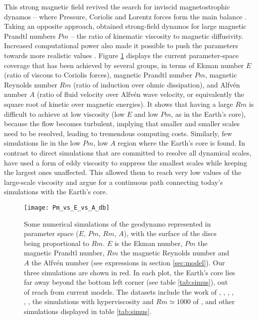 \documentclass[12pt, a4paper]{article}
\begin{document}
This strong magnetic field revived the search for inviscid magnetostrophic dynamos -- where Pressure, Coriolis and Lorentz forces form the main balance \citep{livermore2013, wu2015}.
Taking an opposite approach, \citet{dormy2016} obtained strong-field dynamos for large magnetic Prandtl numbers $Pm$ -- the ratio of kinematic viscosity to magnetic diffusivity.
Increased computational power also made it possible to push the parameters towards more realistic values \citep{kageyama2008,sakuraba2009, sheyko2014phd, yadav2016b}.
Figure \ref{fig:Pm_vs_E} displays the current parameter-space coverage that has been achieved by several groups, in terms of Ekman number $E$ (ratio of viscous to Coriolis forces), magnetic Prandtl number $Pm$, magnetic Reynolds number $Rm$ (ratio of induction over ohmic dissipation), and Alfvén number $A$ (ratio of fluid velocity over Alfvén wave velocity, or equivalently the square root of kinetic over magnetic energies).
It shows that having a large $Rm$ is difficult to achieve at low viscosity (low $E$ and low $Pm$, as in the Earth's core), because the flow becomes turbulent, implying that smaller and smaller scales need to be resolved, leading to tremendous computing costs.
Similarly, few simulations lie in the low $Pm$, low $A$ region where the Earth's core is found.
In contrast to direct simulations that are committed to resolve all dynamical scales, \citet{aubert2017} have used a form of eddy viscosity to suppress the smallest scales while keeping the largest ones unaffected.
This allowed them to reach very low values of the large-scale viscosity and argue for a continuous path connecting today's simulations with the Earth's core.

\begin{figure}
\texttt{[image: Pm\_vs\_E\_vs\_A\_db]}
\caption{Some numerical simulations of the geodynamo represented in parameter space ($E$, $Pm$, $Rm$, $A$), with the surface of the discs being proportional to $Rm$.
$E$ is the Ekman number, $Pm$ the magnetic Prandtl number, $Rm$ the magnetic Reynolds number and $A$ the Alfvén number (see expressions in section \ref{sec:model}).
Our three simulations are shown in red.
In each plot, the Earth's core lies far away beyond the bottom left corner (see table \ref{tab:simus}), out of reach from current models.
The datasets include the work of \citet{christensen2006}, \citet{takahashi2008}, \citet{soderlund2012}, \citet{yadav2016a,yadav2016b}, \citet{sheyko2014phd}, \citet{sheyko2016},
the simulations with hyperviscosity and $Rm \simeq 1000$ of \citet{aubert2017}, and other simulations displayed in table \ref{tab:simus}.
}
\label{fig:Pm_vs_E}
\end{figure}
\end{document}
